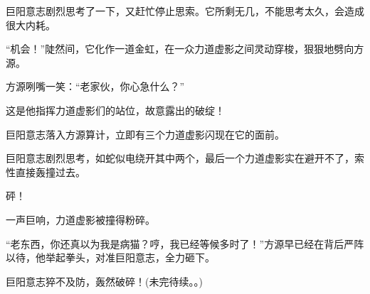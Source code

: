 \begin{this_body}
巨阳意志剧烈思考了一下，又赶忙停止思索。它所剩无几，不能思考太久，会造成很大内耗。

“机会！”陡然间，它化作一道金虹，在一众力道虚影之间灵动穿梭，狠狠地劈向方源。

方源咧嘴一笑：“老家伙，你心急什么？”

这是他指挥力道虚影们的站位，故意露出的破绽！

巨阳意志落入方源算计，立即有三个力道虚影闪现在它的面前。

巨阳意志剧烈思考，如蛇似电绕开其中两个，最后一个力道虚影实在避开不了，索性直接轰撞过去。

砰！

一声巨响，力道虚影被撞得粉碎。

“老东西，你还真以为我是病猫？哼，我已经等候多时了！”方源早已经在背后严阵以待，他举起拳头，对准巨阳意志，全力砸下。

巨阳意志猝不及防，轰然破碎！(未完待续。。)

\end{this_body}

